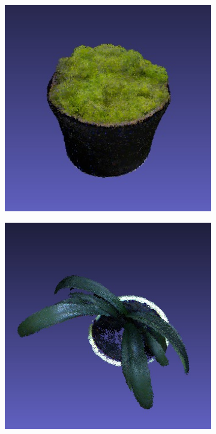 \documentclass[letterpaper, 10 pt, conference]{ieeeconf}  %
\begin{document}
\begin{figure}[th]
        
        \begin{subfigure}[b]{0.5\linewidth}
                \centering
                \includegraphics[width=\linewidth]{../models/plant.jpg}
        \end{subfigure}%
        \begin{subfigure}[b]{0.5\linewidth}
                \centering
                \includegraphics[width=\linewidth]{../models/clivia.jpg}
        \end{subfigure}
        

\end{figure}
\end{document}
